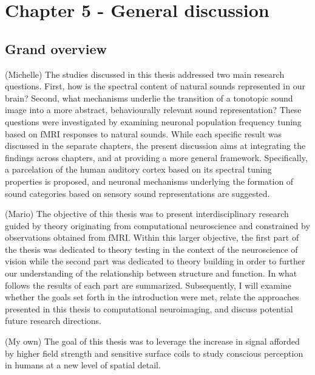 \chapter{Chapter 5 - General discussion}
\lipsum[1-2]

\section{Grand overview}
\blindmathpaper

(Michelle)
The studies discussed in this thesis addressed two main research questions. First, how is the spectral content of natural sounds represented in our brain? Second, what mechanisms underlie the transition of a tonotopic sound image into a more abstract, behaviourally relevant sound representation? These questions were investigated by examining neuronal population frequency tuning based on fMRI responses to natural sounds. While each specific result was discussed in the separate chapters, the present discussion aims at integrating the findings across chapters, and at providing a more general framework. Specifically, a parcelation of the human auditory cortex based on its spectral tuning properties is proposed, and neuronal mechanisms underlying the formation of sound categories based on sensory sound representations are suggested.

(Mario)
The objective of this thesis was to present interdisciplinary research guided by theory originating from computational neuroscience and constrained by observations obtained from fMRI. Within this larger objective, the first part of the thesis was dedicated to theory testing in the context of the neuroscience of vision while the second part was dedicated to theory building in order to further our understanding of the relationship between structure and function. In what follows the results of each part are summarized. Subsequently, I will examine whether the goals set forth in the introduction were met, relate the approaches presented in this thesis to computational neuroimaging, and discuss potential future research directions.

(My own)
The goal of this thesis was to leverage the increase in signal afforded by higher field strength and sensitive surface coils to study conscious perception in humans at a new level of spatial detail.


